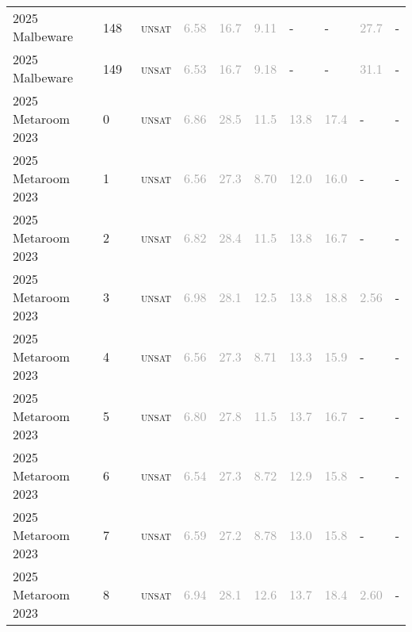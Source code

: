 \begin{center}
{\begin{longtable}{@{}llllllllll@{}}
2025 Malbeware & 148 & ~\textsc{unsat} & \textcolor{darkgray}{6.58} & \textcolor{darkgray}{16.7} & \textcolor{darkgray}{9.11} & - & - & \textcolor{darkgray}{27.7} & - \\
2025 Malbeware & 149 & ~\textsc{unsat} & \textcolor{darkgray}{6.53} & \textcolor{darkgray}{16.7} & \textcolor{darkgray}{9.18} & - & - & \textcolor{darkgray}{31.1} & - \\
\midrule
2025 Metaroom 2023 & 0 & ~\textsc{unsat} & \textcolor{darkgray}{6.86} & \textcolor{darkgray}{28.5} & \textcolor{darkgray}{11.5} & \textcolor{darkgray}{13.8} & \textcolor{darkgray}{17.4} & - & - \\
2025 Metaroom 2023 & 1 & ~\textsc{unsat} & \textcolor{darkgray}{6.56} & \textcolor{darkgray}{27.3} & \textcolor{darkgray}{8.70} & \textcolor{darkgray}{12.0} & \textcolor{darkgray}{16.0} & - & - \\
2025 Metaroom 2023 & 2 & ~\textsc{unsat} & \textcolor{darkgray}{6.82} & \textcolor{darkgray}{28.4} & \textcolor{darkgray}{11.5} & \textcolor{darkgray}{13.8} & \textcolor{darkgray}{16.7} & - & - \\
2025 Metaroom 2023 & 3 & ~\textsc{unsat} & \textcolor{darkgray}{6.98} & \textcolor{darkgray}{28.1} & \textcolor{darkgray}{12.5} & \textcolor{darkgray}{13.8} & \textcolor{darkgray}{18.8} & \textcolor{darkgray}{2.56} & - \\
2025 Metaroom 2023 & 4 & ~\textsc{unsat} & \textcolor{darkgray}{6.56} & \textcolor{darkgray}{27.3} & \textcolor{darkgray}{8.71} & \textcolor{darkgray}{13.3} & \textcolor{darkgray}{15.9} & - & - \\
2025 Metaroom 2023 & 5 & ~\textsc{unsat} & \textcolor{darkgray}{6.80} & \textcolor{darkgray}{27.8} & \textcolor{darkgray}{11.5} & \textcolor{darkgray}{13.7} & \textcolor{darkgray}{16.7} & - & - \\
2025 Metaroom 2023 & 6 & ~\textsc{unsat} & \textcolor{darkgray}{6.54} & \textcolor{darkgray}{27.3} & \textcolor{darkgray}{8.72} & \textcolor{darkgray}{12.9} & \textcolor{darkgray}{15.8} & - & - \\
2025 Metaroom 2023 & 7 & ~\textsc{unsat} & \textcolor{darkgray}{6.59} & \textcolor{darkgray}{27.2} & \textcolor{darkgray}{8.78} & \textcolor{darkgray}{13.0} & \textcolor{darkgray}{15.8} & - & - \\
2025 Metaroom 2023 & 8 & ~\textsc{unsat} & \textcolor{darkgray}{6.94} & \textcolor{darkgray}{28.1} & \textcolor{darkgray}{12.6} & \textcolor{darkgray}{13.7} & \textcolor{darkgray}{18.4} & \textcolor{darkgray}{2.60} & - \\

\end{longtable}}
\end{center}
